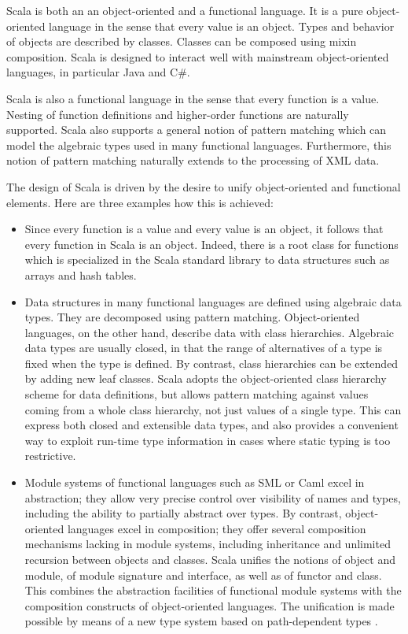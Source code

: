 Scala is both an an object-oriented and a functional language.  It is a
pure object-oriented language in the sense that every value is an
object. Types and behavior of objects are described by
classes. Classes can be composed using mixin composition.  Scala is
designed to interact well with mainstream object-oriented languages,
in particular Java and C\#.

Scala is also a functional language in the sense that every function
is a value. Nesting of function definitions and higher-order functions
are naturally supported. Scala also supports a general notion of
pattern matching which can model the algebraic types used in many
functional languages. Furthermore, this notion of pattern matching
naturally extends to the processing of XML data.

The design of Scala is driven by the desire to unify object-oriented
and functional elements. Here are three examples how this is achieved:
\begin{itemize}
\item
Since every function is a value and every value is an object, it
follows that every function in Scala is an object. Indeed, there is a
root class for functions which is specialized in the Scala standard
library to data structures such as arrays and hash tables.
\item
Data structures in many functional languages are defined using
algebraic data types. They are decomposed using pattern matching.
Object-oriented languages, on the other hand, describe data with class
hierarchies. Algebraic data types are usually closed, in that the
range of alternatives of a type is fixed when the type is defined.  By
contrast, class hierarchies can be extended by adding new leaf
classes.  Scala adopts the object-oriented class hierarchy scheme for
data definitions, but allows pattern matching against values coming
from a whole class hierarchy, not just values of a single type.
This can express both closed and extensible data types, and also
provides a convenient way to exploit run-time type information in
cases where static typing is too restrictive.
\item
Module systems of functional languages such as SML or Caml excel in
abstraction; they allow very precise control over visibility of names
and types, including the ability to partially abstract over types.  By
contrast, object-oriented languages excel in composition; they offer
several composition mechanisms lacking in module systems, including
inheritance and unlimited recursion between objects and classes.
Scala unifies the notions of object and module, of module signature
and interface, as well as of functor and class. This combines the
abstraction facilities of functional module systems with the
composition constructs of object-oriented languages. The unification
is made possible by means of a new type system based on path-dependent
types \cite{odersky-et-al:fool10}.
\end{itemize}
